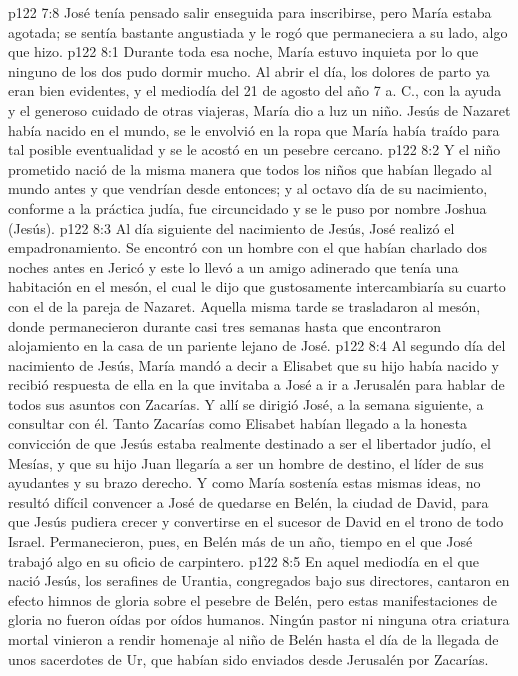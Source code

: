 \vs p122 7:8 José tenía pensado salir enseguida para inscribirse, pero María estaba agotada; se sentía bastante angustiada y le rogó que permaneciera a su lado, algo que hizo.
\vs p122 8:1 Durante toda esa noche, María estuvo inquieta por lo que ninguno de los dos pudo dormir mucho. Al abrir el día, los dolores de parto ya eran bien evidentes, y el mediodía del 21 de agosto del año 7 a. C., con la ayuda y el generoso cuidado de otras viajeras, María dio a luz un niño. Jesús de Nazaret había nacido en el mundo, se le envolvió en la ropa que María había traído para tal posible eventualidad y se le acostó en un pesebre cercano.
\vs p122 8:2 Y el niño prometido nació de la misma manera que todos los niños que habían llegado al mundo antes y que vendrían desde entonces; y al octavo día de su nacimiento, conforme a la práctica judía, fue circuncidado y se le puso por nombre Joshua (Jesús).
\vs p122 8:3 Al día siguiente del nacimiento de Jesús, José realizó el empadronamiento. Se encontró con un hombre con el que habían charlado dos noches antes en Jericó y este lo llevó a un amigo adinerado que tenía una habitación en el mesón, el cual le dijo que gustosamente intercambiaría su cuarto con el de la pareja de Nazaret. Aquella misma tarde se trasladaron al mesón, donde permanecieron durante casi tres semanas hasta que encontraron alojamiento en la casa de un pariente lejano de José.
\vs p122 8:4 Al segundo día del nacimiento de Jesús, María mandó a decir a Elisabet que su hijo había nacido y recibió respuesta de ella en la que invitaba a José a ir a Jerusalén para hablar de todos sus asuntos con Zacarías. Y allí se dirigió José, a la semana siguiente, a consultar con él. Tanto Zacarías como Elisabet habían llegado a la honesta convicción de que Jesús estaba realmente destinado a ser el libertador judío, el Mesías, y que su hijo Juan llegaría a ser un hombre de destino, el líder de sus ayudantes y su brazo derecho. Y como María sostenía estas mismas ideas, no resultó difícil convencer a José de quedarse en Belén, la ciudad de David, para que Jesús pudiera crecer y convertirse en el sucesor de David en el trono de todo Israel. Permanecieron, pues, en Belén más de un año, tiempo en el que José trabajó algo en su oficio de carpintero.
\vs p122 8:5 \pc En aquel mediodía en el que nació Jesús, los serafines de Urantia, congregados bajo sus directores, cantaron en efecto himnos de gloria sobre el pesebre de Belén, pero estas manifestaciones de gloria no fueron oídas por oídos humanos. Ningún pastor ni ninguna otra criatura mortal vinieron a rendir homenaje al niño de Belén hasta el día de la llegada de unos sacerdotes de Ur, que habían sido enviados desde Jerusalén por Zacarías.
